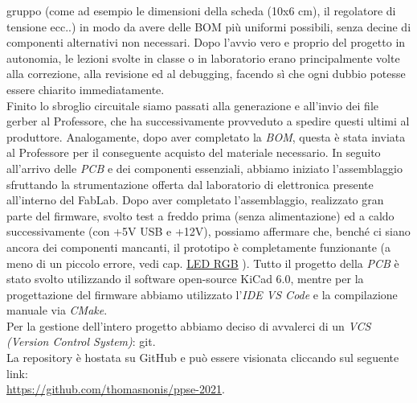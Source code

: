 gruppo (come ad esempio le dimensioni della scheda (10x6 cm), il
regolatore di tensione ecc..) in modo da avere delle BOM più uniformi
possibili, senza decine di componenti alternativi non necessari. Dopo
l'avvio vero e proprio del progetto in autonomia, le lezioni svolte in
classe o in laboratorio erano principalmente volte alla correzione, alla
revisione ed al debugging, facendo sì che ogni dubbio potesse essere
chiarito immediatamente.\\
Finito lo sbroglio circuitale siamo passati alla generazione e all'invio
dei file gerber al Professore, che ha successivamente provveduto a
spedire questi ultimi al produttore. Analogamente, dopo aver completato
la \emph{BOM}, questa è stata inviata al Professore per il conseguente
acquisto del materiale necessario. In seguito all'arrivo delle
\emph{PCB} e dei componenti essenziali, abbiamo iniziato l'assemblaggio
sfruttando la strumentazione offerta dal laboratorio di elettronica
presente all'interno del FabLab. Dopo aver completato l'assemblaggio,
realizzato gran parte del firmware, svolto test a freddo prima (senza
alimentazione) ed a caldo successivamente (con +5V USB e +12V), possiamo
affermare che, benché ci siano ancora dei componenti mancanti, il
prototipo è completamente funzionante (a meno di un piccolo errore, vedi
cap. \protect\hyperlink{led-rgb}{\underline{LED RGB}} ).
Tutto il progetto della \emph{PCB} è stato svolto utilizzando il
software open-source KiCad 6.0, mentre per la progettazione del firmware
abbiamo utilizzato l'\emph{IDE VS Code} e la compilazione manuale via
\emph{CMake}.\\
Per la gestione dell'intero progetto abbiamo deciso di avvalerci di un
\emph{VCS (Version Control System)}: git.\\
La repository è hostata su GitHub e può essere visionata cliccando sul
seguente link:\\
\href{https://github.com/thomasnonis/ppse-2021}{\underline{https://github.com/thomasnonis/ppse-2021}}.
